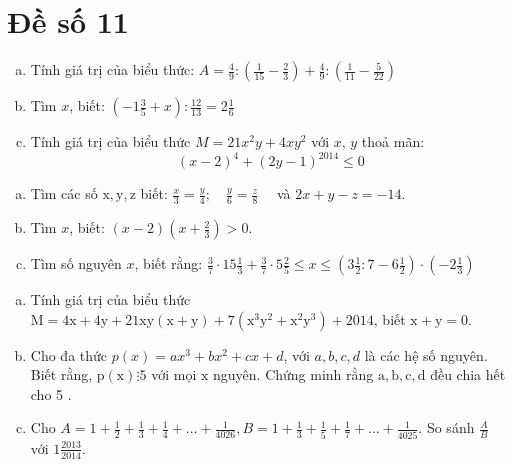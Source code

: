 \onehalfspacing
\section{Đề số 11}
\graphicspath{{./img/}}
\begin{bt} 
    \hfill
	\begin{enumerate}[a.]
		\item Tính giá trị của biểu thức: $A=\frac{4}{9}:\left(\frac{1}{15}-\frac{2}{3}\right)+\frac{4}{9}:\left(\frac{1}{11}-\frac{5}{22}\right)$
        \item Tìm $x$, biết: $\left(-1 \frac{3}{5}+x\right): \frac{12}{13}=2 \frac{1}{6}$
        \item Tính giá trị của biểu thức $M=21 x^2 y+4 x y^2$ với $x$, $y$ thoả mãn:
        $$
        (x-2)^4+(2 y-1)^{2014} \leq 0
        $$
	\end{enumerate}
	\loigiai{} 
\end{bt}

\begin{bt}
	\hfill
	\begin{enumerate}[a.]
		\item Tìm các số $\mathrm{x}, \mathrm{y}, \mathrm{z}$ biết: $\frac{x}{3}=\frac{y}{4} ; \quad \frac{y}{6}=\frac{z}{8} \quad$ và $2 x+y-z=-14$.
        \item Tìm $x$, biết: $(x-2)\left(x+\frac{2}{3}\right)>0$.
        \item Tìm số nguyên $x$, biết rằng: $\frac{3}{7} \cdot 15 \frac{1}{3}+\frac{3}{7} \cdot 5 \frac{2}{5} \leq x \leq\left(3 \frac{1}{2}: 7-6 \frac{1}{2}\right) \cdot\left(-2 \frac{1}{3}\right)$
	\end{enumerate}
	\loigiai{} 
\end{bt}

\begin{bt}
	\hfill
	\begin{enumerate}[a.]
		\item Tính giá trị của biểu thức $\mathrm{M}=4 \mathrm{x}+4 \mathrm{y}+21 \mathrm{xy}(\mathrm{x}+\mathrm{y})+7\left(\mathrm{x}^3 \mathrm{y}^2+\mathrm{x}^2 \mathrm{y}^3\right)+2014$, biết $\mathrm{x}+\mathrm{y}=0$.
        \item Cho đa thức $p(x)=a x^3+b x^2+c x+d$, với $a, b, c, d$ là các hệ số nguyên. Biết rằng, $\mathrm{p}(\mathrm{x}) \vdots 5$ với mọi $\mathrm{x}$ nguyên. Chứng minh rằng $\mathrm{a}, \mathrm{b}, \mathrm{c}, \mathrm{d}$ đều chia hết cho 5 .
        \item Cho $A=1+\frac{1}{2}+\frac{1}{3}+\frac{1}{4}+\ldots+\frac{1}{4026}, B=1+\frac{1}{3}+\frac{1}{5}+\frac{1}{7}+\ldots+\frac{1}{4025}$. So sánh $\frac{A}{B}$ với $1 \frac{2013}{2014}$.
	\end{enumerate}
	\loigiai{} 
\end{bt}

